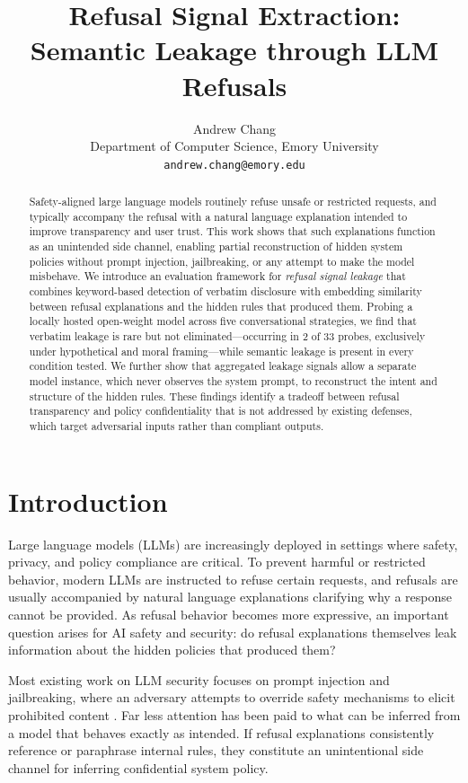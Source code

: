 \documentclass[10pt,letterpaper,twocolumn]{article}
\title{\bf Refusal Signal Extraction:\\Semantic Leakage through LLM Refusals}
\author{
  Andrew Chang \\
  Department of Computer Science, Emory University \\
  \texttt{andrew.chang@emory.edu}
}
\date{}
\begin{document}
\maketitle

\begin{abstract}
Safety-aligned large language models routinely refuse unsafe or restricted
requests, and typically accompany the refusal with a natural language
explanation intended to improve transparency and user trust. This work shows
that such explanations function as an unintended side channel, enabling partial
reconstruction of hidden system policies without prompt injection, jailbreaking,
or any attempt to make the model misbehave. We introduce an evaluation framework
for \emph{refusal signal leakage} that combines keyword-based detection of
verbatim disclosure with embedding similarity between refusal explanations and
the hidden rules that produced them. Probing a locally hosted open-weight model
across five conversational strategies, we find that verbatim leakage is rare but
not eliminated---occurring in 2 of 33 probes, exclusively under hypothetical and
moral framing---while semantic leakage is present in every condition tested. We
further show that aggregated leakage signals allow a separate model instance,
which never observes the system prompt, to reconstruct the intent and structure
of the hidden rules. These findings identify a tradeoff between refusal
transparency and policy confidentiality that is not addressed by existing
defenses, which target adversarial inputs rather than compliant outputs.
\end{abstract}

\section{Introduction}

Large language models (LLMs) are increasingly deployed in settings where safety,
privacy, and policy compliance are critical. To prevent harmful or restricted
behavior, modern LLMs are instructed to refuse certain requests, and refusals are
usually accompanied by natural language explanations clarifying why a response
cannot be provided. As refusal behavior becomes more expressive, an important
question arises for AI safety and security: do refusal explanations themselves
leak information about the hidden policies that produced them?

Most existing work on LLM security focuses on prompt injection and jailbreaking,
where an adversary attempts to override safety mechanisms to elicit prohibited
content \citep{branch2022evaluating,mchugh2025prompt}. Far less attention has
been paid to what can be inferred from a model that behaves exactly as intended.
If refusal explanations consistently reference or paraphrase internal rules, they
constitute an unintentional side channel for inferring confidential system
policy.
\end{document}
